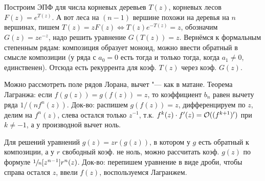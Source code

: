 \section{} %
	Построим ЭПФ для числа корневых деревьев $T(z)$, корневых лесов $F(z)=e^{T(z)}$.
	А вот леса на $(n-1)$ вершине похожи на деревья на $n$ вершинах, пишем $T(z)=zF(z) \iff T(z)e^{-T(z)}=z$,
	обозначим $G(z)=ze^{-z}$, надо решить уравнение $G(T(z))=z$.
	Вернёмся к формальным степенным рядам: композиция образует моноид,
	можно ввести обратный в смысле композиции (у ряда с $a_0=0$ есть тогда и только тогда,
	когда $a_1 \neq 0$, единственен).
	Отсюда есть рекуррента для коэф. $T(z)$ через коэф. $G(z)$.

	Можно рассмотреть поле рядов Лорана, вычет "--- как в матане.
	Теорема Лагранжа: если $f(g(z))=g(f(z))=z$, то коэффициент $b_n$ равен
	вычету ряда $1/(nf^n(z))$.
	Док-во: распишем $g(f(z))=z$, дифференцируем по $z$, делим на $f^n(z)$,
	слева остался только $z^{-1}$, т.к. $f^k(z)\cdot f'(z)=\mathcal O((f^{k+1})')$ при $k\neq -1$,
	а у производной вычет ноль.

	Для решений уравнений $g(z)=zr(g(z))$, в котором у $g$ есть обратный к композиции,
	а у $r$ свободный коэф. не ноль, можно рассчитать коэф. $g(z)$ по формуле $\sfrac 1n [z^{n-1}]r^n(z)$.
	Док-во: перепишем уравнение в виде дроби, чтобы справа остался $z$, ввели $f(z)$,
	воспользуемся Лагранжем.

	\TODO

\section{} %
	\TODO
